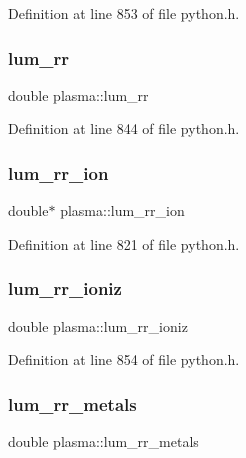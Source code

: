 Definition at line 853 of file python.\+h.

\mbox{\label{structplasma_a7c1a796efafeae5c9aacfbea4e6a79c3}} 
\subsubsection{\texorpdfstring{lum\+\_\+rr}{lum\_rr}}
{\footnotesize\ttfamily double plasma\+::lum\+\_\+rr}



Definition at line 844 of file python.\+h.

\mbox{\label{structplasma_a82db22eb07618b0844344790fc875166}} 
\subsubsection{\texorpdfstring{lum\+\_\+rr\+\_\+ion}{lum\_rr\_ion}}
{\footnotesize\ttfamily double$\ast$ plasma\+::lum\+\_\+rr\+\_\+ion}



Definition at line 821 of file python.\+h.

\mbox{\label{structplasma_acc048dd6ede76041e2a872cdca2ebb8f}} 
\subsubsection{\texorpdfstring{lum\+\_\+rr\+\_\+ioniz}{lum\_rr\_ioniz}}
{\footnotesize\ttfamily double plasma\+::lum\+\_\+rr\+\_\+ioniz}



Definition at line 854 of file python.\+h.

\mbox{\label{structplasma_abdee1a55696e7928736435858f69d51f}} 
\subsubsection{\texorpdfstring{lum\+\_\+rr\+\_\+metals}{lum\_rr\_metals}}
{\footnotesize\ttfamily double plasma\+::lum\+\_\+rr\+\_\+metals}




